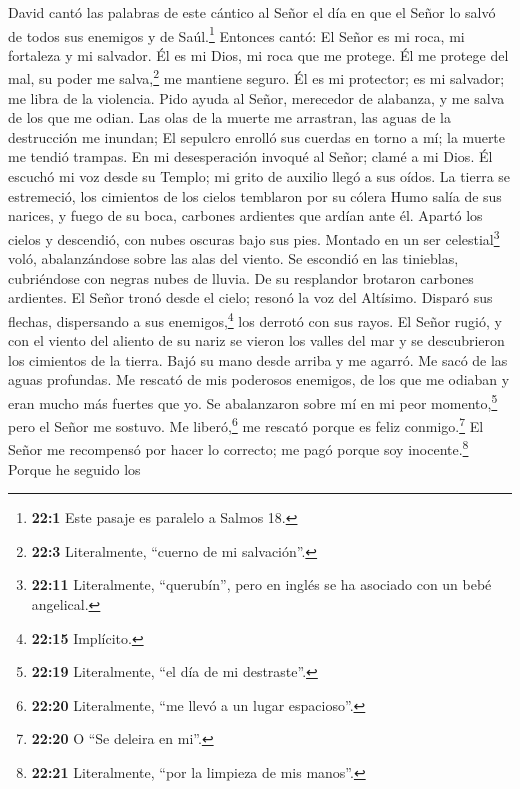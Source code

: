  David cantó las palabras de este cántico al Señor el día
en que el Señor lo salvó de todos sus enemigos y de Saúl.\footnote{\textbf{22:1}
  Este pasaje es paralelo a Salmos 18.}  Entonces cantó:
El Señor es mi roca, mi fortaleza y mi salvador.  Él es mi
Dios, mi roca que me protege. Él me protege del mal, su poder me
salva,\footnote{\textbf{22:3} Literalmente, ``cuerno de mi salvación''.}
me mantiene seguro. Él es mi protector; es mi salvador; me libra de la
violencia.  Pido ayuda al Señor, merecedor de alabanza, y
me salva de los que me odian.  Las olas de la muerte me
arrastran, las aguas de la destrucción me inundan;  El
sepulcro enrolló sus cuerdas en torno a mí; la muerte me tendió trampas.
 En mi desesperación invoqué al Señor; clamé a mi Dios. Él
escuchó mi voz desde su Templo; mi grito de auxilio llegó a sus oídos.
 La tierra se estremeció, los cimientos de los cielos
temblaron por su cólera  Humo salía de sus narices, y
fuego de su boca, carbones ardientes que ardían ante él. 
Apartó los cielos y descendió, con nubes oscuras bajo sus pies.
 Montado en un ser celestial\footnote{\textbf{22:11}
  Literalmente, ``querubín'', pero en inglés se ha asociado con un bebé
  angelical.} voló, abalanzándose sobre las alas del viento.
 Se escondió en las tinieblas, cubriéndose con negras
nubes de lluvia.  De su resplandor brotaron carbones
ardientes.  El Señor tronó desde el cielo; resonó la voz
del Altísimo.  Disparó sus flechas, dispersando a sus
enemigos,\footnote{\textbf{22:15} Implícito.} los derrotó con sus rayos.
 El Señor rugió, y con el viento del aliento de su nariz
se vieron los valles del mar y se descubrieron los cimientos de la
tierra.  Bajó su mano desde arriba y me agarró. Me sacó
de las aguas profundas.  Me rescató de mis poderosos
enemigos, de los que me odiaban y eran mucho más fuertes que yo.
 Se abalanzaron sobre mí en mi peor momento,\footnote{\textbf{22:19}
  Literalmente, ``el día de mi destraste''.} pero el Señor me sostuvo.
 Me liberó,\footnote{\textbf{22:20} Literalmente, ``me
  llevó a un lugar espacioso''.} me rescató porque es feliz
conmigo.\footnote{\textbf{22:20} O ``Se deleira en mi''.}
 El Señor me recompensó por hacer lo correcto; me pagó
porque soy inocente.\footnote{\textbf{22:21} Literalmente, ``por la
  limpieza de mis manos''.}  Porque he seguido los
